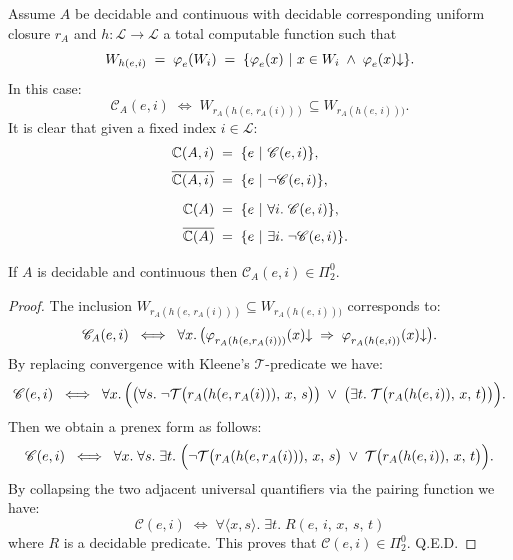 \documentclass[runningheads]{llncs}
\makeatletter
\def\ok#1{\mbox{\raisebox{0ex}[1ex][1ex]{$#1$}}}
\newcommand{\myqed}{\textsc{Q.E.D.}}
\def\grasse#1{{\llbracket #1 \rrbracket}}
\def\bbbc{{\mathbb{C}}}
\newcommand{\ccL}{\mathscr{L}}
\newcommand{\NF}{{\mathcal{T}}}
\newcommand{\pfunction}[3]{\ok{\varphi^{#2\, #3}_{#1}}}
\newcommand{\compl}[1]{\ok{\overline{#1}}}
\newcommand{\ra}{\rightarrow}
\newcommand{\Ra}{\Rightarrow}
\def\ok#1{\mbox{\raisebox{0ex}[1ex][1ex]{$#1$}}}
\def\predC{\mathscr{C}}
\def\cAA{\ensuremath{A}}
\newcommand{\sset}[2]{\{#1  ~|~ #2\}}
\newcommand{\TODO}{\@ifnextchar[{\@TODO}{\@@TODO}}
\makeatother
\begin{document}

Assume $\cAA$ be decidable and continuous with decidable corresponding uniform closure $r_{\cAA}$ and 
$h:\ccL\ra\ccL$ a total computable function such that 
    \[
     W_{h(e,i)} \;=\; \pfunction{e}{}{}(W_{i})
        \;=\; \sset{\pfunction{e}{}{}(x)}{x \in W_{i} \;\land\; \pfunction{e}{}{}(x){\downarrow}}.
    \]
In this case:
\[
  \predC_\cAA(e,i) \;\iff\; W_{r_{\cAA}(h(e,\,r_{\cAA}(i)))} \subseteq W_{r_{\cAA}(h(e,\,i)))}.
\]
It is clear that given a fixed index $i\in\ccL$:
\begin{align*}
  \bbbc(\cAA,i) \;&=\; \sset{e}{\predC(e,i)},\\[1ex]
\compl{\bbbc(\cAA,i)} \;&=\; \sset{e}{\neg\predC(e,i)},\\[1ex]
  \bbbc(\cAA) \;&=\; \sset{e}{\forall i.\; \predC(e,i)}, \\[1ex]
  \compl{\bbbc(\cAA)} \;&=\; \sset{e}{\exists i.\; \neg\predC(e,i)}.
\end{align*}

\begin{lemma}\label{hierarchy}
    If $\cAA$ is decidable and continuous then $\predC_\cAA(e,i) \in \Pi^0_2$.
\end{lemma}

\begin{proof}
The inclusion $W_{r_{\cAA}(h(e,\,r_{\cAA}(i)))} \subseteq W_{r_{\cAA}(h(e,\,i)))}$ corresponds to:
\[
  \predC_\cAA(e,i) \;\iff\;
  \forall x.\,\bigl(\pfunction{r_{\cAA}(h(e,r_{\cAA}(i)))}{}{}(x){\downarrow}
  \;\Ra\;
  \pfunction{r_{\cAA}(h(e,i))}{}{}(x){\downarrow}\bigr).
\]
By replacing convergence with Kleene's $\NF$-predicate we have:
\[
  \predC(e,i) \;\iff\;
  \forall x.\,\Bigl(
    \bigl(\forall s.\;\neg \NF\bigl(r_{\cAA}(h(e,r_{\cAA}(i))),\, x,\, s\bigr)\bigr)
    \;\lor\;
    \bigl(\exists t.\; \NF\bigl(r_{\cAA}(h(e,i)),\, x,\, t\bigr)\bigr)
  \Bigr).
\]
Then we obtain a prenex form as follows:
\[
  \predC(e,i) \;\iff\;
  \forall x.\;\forall s.\;\exists t.\;
  \Bigl(\neg \NF\bigl(r_{\cAA}(h(e,r_{\cAA}(i))),\, x,\, s\bigr)
  \;\lor\;
  \NF\bigl(r_{\cAA}(h(e,i)),\, x,\, t\bigr)\Bigr).
\]
By collapsing the two adjacent universal quantifiers via the pairing function we have:
\[
  \predC(e,i) \;\iff\;
  \forall \langle x, s \rangle.\;\exists t.\;
  R(e,\, i,\, x,\, s,\, t)
\]
where $R$ is a decidable predicate.  This proves that $\predC(e,i) \in \Pi^0_2$. \myqed
\end{proof}
\end{document}
